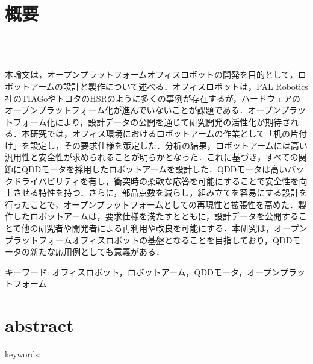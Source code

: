 \chapter*{概要}
\thispagestyle{empty}
%
\begin{center}
  \scalebox{1.5}{オープンプラットフォームオフィスロボットの開発}\\
  \scalebox{1.2}{-QDDモータを使用したロボットアームの設計と製作-}\\
\end{center}
\vspace{1.0zh}
%
本論文は，オープンプラットフォームオフィスロボットの開発を目的として，ロボットアームの設計と製作について述べる．オフィスロボットは，PAL Robotics社のTIAGoやトヨタのHSRのように多くの事例が存在するが，ハードウェアのオープンプラットフォーム化が進んでいないことが課題である．オープンプラットフォーム化により，設計データの公開を通じて研究開発の活性化が期待される．本研究では，オフィス環境におけるロボットアームの作業として「机の片付け」を設定し，その要求仕様を策定した．分析の結果，ロボットアームには高い汎用性と安全性が求められることが明らかとなった．これに基づき，すべての関節にQDDモータを採用したロボットアームを設計した．QDDモータは高いバックドライバビリティを有し，衝突時の柔軟な応答を可能にすることで安全性を向上させる特性を持つ．さらに，部品点数を減らし，組み立てを容易にする設計を行ったことで，オープンプラットフォームとしての再現性と拡張性を高めた．製作したロボットアームは，要求仕様を満たすとともに，設計データを公開することで他の研究者や開発者による再利用や改良を可能にする．本研究は，オープンプラットフォームオフィスロボットの基盤となることを目指しており，QDDモータの新たな応用例としても意義がある．

キーワード: オフィスロボット，ロボットアーム，QDDモータ，オープンプラットフォーム

%
\newpage
\chapter*{abstract}
\thispagestyle{empty}
%
\begin{center}
  \scalebox{1.3}{title}
\end{center}
\vspace{1.0zh}
%


keywords: 
